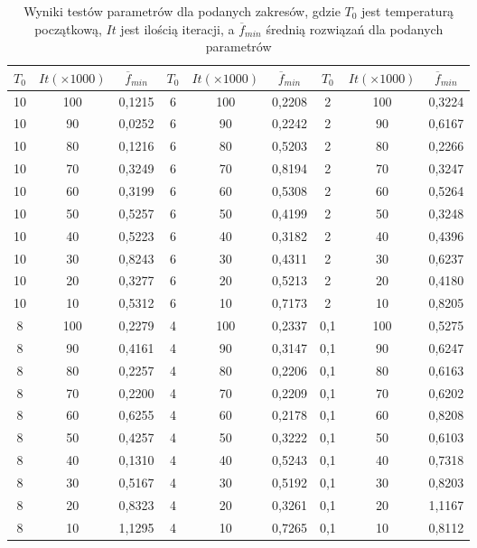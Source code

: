 \documentclass[twoside]{projektInzynierskiMS1}
\newcommand{\si}{ś}
\begin{document}
\begin{table}[htbp]\centering
\def\sym#1{\ifmmode^{#1}\else\(^{#1}\)\fi}
\caption{Wyniki testów parametrów dla podanych zakresów, gdzie $T_0$ jest temperaturą początkową, $It$ jest ilo\si cią iteracji, a $\overline{f}_{min}$ \si rednią rozwiązań dla podanych parametrów}
\begin{tabular}{|c|c|c||c|c|c||c|c|c|} 
                  \hline
                   $T_0$
                  & $It (\times 1000)$
                  &$\overline{f}_{min}$ 
& $T_0$
 & $It(\times 1000)$ 
 &$\overline{f}_{min}$ 
& $T_0$
& $It (\times 1000)$
&$\overline{f}_{min}$ \\ \hline
10 & 100 & 0,1215 &6 & 100 & 0,2208& 2 & 100 & 0,3224 \\ \hline
10 & 90 & 0,0252  &6 & 90 & 0,2242& 2 & 90 & 0,6167\\ \hline
10 & 80 & 0,1216 &6 & 80 & 0,5203  & 2 & 80 & 0,2266 \\ \hline
10 & 70 & 0,3249 &6 & 70 & 0,8194 & 2 & 70 & 0,3247\\ \hline 
10 & 60 & 0,3199  &6 & 60 & 0,5308 & 2 & 60 & 0,5264\\ \hline 
10 & 50 & 0,5257  &6 & 50 & 0,4199& 2 & 50 & 0,3248\\ \hline
10 & 40 & 0,5223 &6 & 40 & 0,3182  & 2 & 40 & 0,4396\\ \hline 
10 & 30 & 0,8243 &6 & 30 & 0,4311 & 2 & 30 & 0,6237\\ \hline
10 & 20 & 0,3277  &6 & 20 & 0,5213& 2 & 20 & 0,4180\\ \hline 
10 & 10 & 0,5312  &6 & 10 & 0,7173& 2 & 10 & 0,8205\\ \Xhline{3\arrayrulewidth}

8 & 100 & 0,2279& 4 & 100 & 0,2337   & 0,1 & 100 & 0,5275 \\ \hline 
8 & 90 & 0,4161 & 4 & 90 & 0,3147  &0,1 & 90 & 0,6247 \\ \hline 
8 & 80 & 0,2257 & 4 & 80 & 0,2206 &0,1 & 80 & 0,6163 \\ \hline 
8 & 70 & 0,2200 & 4 & 70 & 0,2209 &0,1 & 70 & 0,6202 \\ \hline 
8 & 60 & 0,6255& 4 & 60 & 0,2178  & 0,1 & 60 & 0,8208 \\ \hline
8 & 50 & 0,4257 & 4 & 50 & 0,3222 & 0,1 & 50 & 0,6103 \\ \hline 
8 & 40 & 0,1310 & 4 & 40 & 0,5243 &0,1 & 40 & 0,7318\\ \hline 
8 & 30 & 0,5167 & 4 & 30 & 0,5192  &0,1 & 30 & 0,8203 \\ \hline 
8 & 20 & 0,8323 & 4 & 20 & 0,3261  & 0,1 & 20 & 1,1167 \\ \hline
8 & 10 & 1,1295 & 4 & 10 & 0,7265& 0,1 & 10 & 0,8112 \\ \hline  
\end{tabular} 
\end{table}
\end{document}
